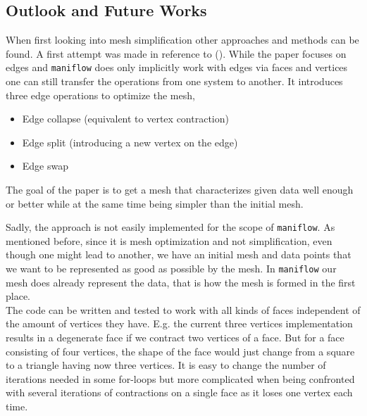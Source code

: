 \subsection{Outlook and Future Works}
When first looking into mesh simplification other approaches and methods can be found. A first attempt was made in reference to (\cite{Hoppe}). While the paper focuses on edges and \texttt{maniflow} does only implicitly work with edges via faces and vertices one can still transfer the operations from one system to another. It introduces three edge operations to optimize the mesh,
\begin{itemize}
    \item Edge collapse (equivalent to vertex contraction)
    \item Edge split (introducing a new vertex on the edge)
    \item Edge swap
\end{itemize}
The goal of the paper is to get a mesh that characterizes given data well enough or better while at the same time being simpler than the initial mesh.

Sadly, the approach is not easily implemented for the scope of \texttt{maniflow}. As mentioned before, since it is mesh optimization and not simplification, even though one might lead to another, we have an initial mesh and data points that we want to be represented as good as possible by the mesh. In \texttt{maniflow} our mesh does already represent the data, that is how the mesh is formed in the first place.\\

The code can be written and tested to work with all kinds of faces independent of the amount of vertices they have. E.g. the current three vertices implementation results in a degenerate face if we contract two vertices of a face. But for a face consisting of four vertices, the shape of the face would just change from a square to a triangle having now three vertices. It is easy to change the number of iterations needed in some for-loops but more complicated when being confronted with several iterations of contractions on a single face as it loses one vertex each time.